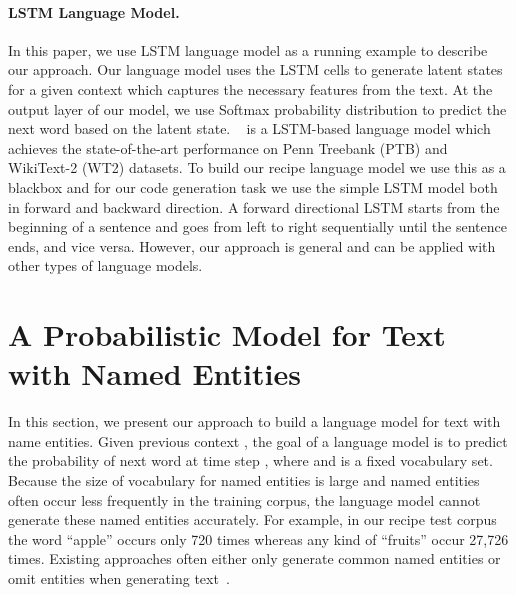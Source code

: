\documentclass[11pt,a4paper]{article}
\begin{document}
\paragraph{\bf LSTM Language Model.}
In this paper, we use LSTM language model as a running example to describe our approach.
Our language model uses the LSTM cells to generate latent states for a given context which captures the necessary features from the text. At the output layer of our model, we use Softmax probability distribution to predict the next word based on the latent state. ~ is a LSTM-based language model which achieves the state-of-the-art performance on Penn Treebank (PTB) and WikiText-2 (WT2) datasets. To build our recipe language model we use this as a blackbox and for our code generation task we use the simple LSTM model both in forward and backward direction. A forward directional LSTM starts from the beginning of a sentence and goes from left to right sequentially until the sentence ends, and vice versa. However, our approach is general and can be applied with other types of language models. 












 


\section{A Probabilistic Model for Text with Named Entities}
In this section, we present our approach to build a language model for text with name entities. Given previous context  , the goal of a language model is to predict the probability of next word  at time step , where  and  is a fixed vocabulary set. 
Because the size of vocabulary for named entities is large and  named entities often occur less frequently in the training corpus, the language model cannot generate these named entities accurately. For example, in our recipe test corpus the word ``apple'' occurs only 720 times whereas any kind of ``fruits'' occur 27,726 times.  Existing approaches often either only generate common named entities or omit entities when generating text~\cite{jozefowicz2016exploring}. 
\end{document}
